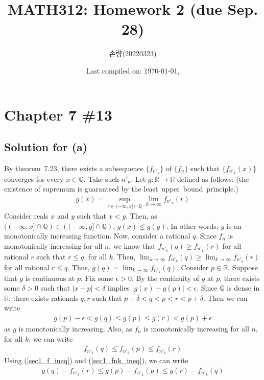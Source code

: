 \documentclass{scrartcl}
\title{MATH312: Homework 2 (due Sep. 28)}
\author{손량(20220323)}
\date{Last compiled on: \today, \currenttime}
\begin{document}
\maketitle

\section{Chapter 7 \#13}
\subsection{Solution for (a)}
By theorem~7.23, there exists a subsequence \(\{f_{n'_k}\}\) of \(\{f_n\}\)
such that \(\{f_{n'_k}(x)\}\) converges for every \(x \in \mathbb{Q}\). Take
such \(n'_k\). Let \(g: \mathbb{R} \to \mathbb{R}\) defined as follows: (the
existence of supremum is guaranteed by the least~upper~bound~principle.)
\begin{align*}
  g(x)
  = \sup_{r \in (-\infty, x] \cap \mathbb{Q}} \lim_{k \to \infty} f_{n'_k}(r)
\end{align*}
Consider reals \(x\) and \(y\) such that \(x < y\). Then, as \(((-\infty, x]
\cap \mathbb{Q}) \subset ((-\infty, y] \cap \mathbb{Q})\), \(g(x) \le g(y)\).
In other words, \(g\) is an monotonically increasing function. Now, consider a
rational \(q\). Since \(f_n\) is monotonically increasing for all \(n\), we
know that \(f_{n'_k}(q) \ge f_{n'_k}(r)\) for all rational \(r\) such that \(r
\le q\), for all \(k\). Then, \(\lim_{k \to \infty} f_{n'_k}(q) \ge \lim_{k \to
\infty} f_{n'_k}(r)\) for all rational \(r \le q\). Thus, \(g(q) = \lim_{k \to
\infty} f_{n'_k}(q)\). Consider \(p \in \mathbb{R}\). Suppose that \(g\) is
continuous at \(p\). Fix some \(\epsilon > 0\). By the continuity of \(g\) at
\(p\), there exists some \(\delta > 0\) such that \(|x - p| < \delta\) implies
\(|g(x) - g(p)| < \epsilon\). Since \(\mathbb{Q}\) is dense in \(\mathbb{R}\),
there exists rationals \(q, r\) such that \(p - \delta < q < p < r < p +
\delta\). Then we can write
\begin{align}\label{sec1_f_ineq}
  g(p) - \epsilon < g(q) \le g(p) \le g(r) < g(p) + \epsilon
\end{align}
as \(g\) is monotonically increasing. Also, as \(f_n\) is monotonically
increasing for all \(n\), for all \(k\), we can write
\begin{align}\label{sec1_fnk_ineq}
  f_{n'_k}(q) \le f_{n'_k}(p) \le f_{n'_k}(r)
\end{align}
Using (\ref{sec1_f_ineq}) and (\ref{sec1_fnk_ineq}), we can write
\begin{align*}
  g(q) - f_{n'_k}(r) \le g(p) - f_{n'_k}(p) \le g(r) - f_{n'_k}(q)
\end{align*}
\end{document}
